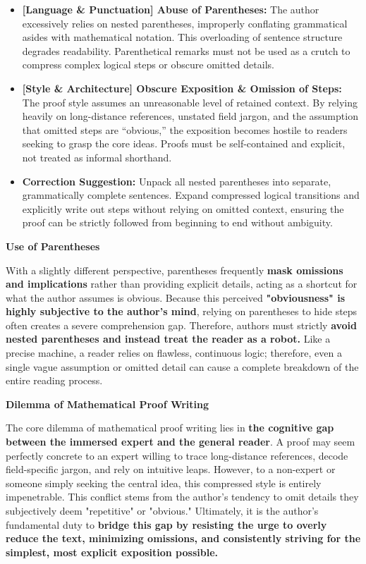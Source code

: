 \documentclass[11pt, a4paper]{article}
\begin{document}
\begin{itemize}
    \item \textcolor{NavyBlue}{\textbf{[Language \& Punctuation] Abuse of Parentheses:}} The author excessively relies on nested parentheses, improperly conflating grammatical asides with mathematical notation. This overloading of sentence structure degrades readability. Parenthetical remarks must not be used as a crutch to compress complex logical steps or obscure omitted details.
    
    \item \textcolor{RustOrange}{\textbf{[Style \& Architecture] Obscure Exposition \& Omission of Steps:}} The proof style assumes an unreasonable level of retained context. By relying heavily on long-distance references, unstated field jargon, and the assumption that omitted steps are ``obvious,'' the exposition becomes hostile to readers seeking to grasp the core ideas. Proofs must be self-contained and explicit, not treated as informal shorthand.
    
    \item \textbf{Correction Suggestion:} Unpack all nested parentheses into separate, grammatically complete sentences. Expand compressed logical transitions and explicitly write out steps without relying on omitted context, ensuring the proof can be strictly followed from beginning to end without ambiguity.
\end{itemize}

\textbf{Use of Parentheses}

With a slightly different perspective, parentheses frequently \textbf{mask omissions and implications} rather than providing explicit details, acting as a shortcut for what the author assumes is obvious. Because this perceived \textbf{"obviousness" is highly subjective to the author's mind}, relying on parentheses to hide steps often creates a severe comprehension gap. Therefore, authors must strictly \textbf{avoid nested parentheses and instead treat the reader as a robot.} Like a precise machine, a reader relies on flawless, continuous logic; therefore, even a single vague assumption or omitted detail can cause a complete breakdown of the entire reading process.

\textbf{Dilemma of Mathematical Proof Writing}

The core dilemma of mathematical proof writing lies in \textbf{the cognitive gap between the immersed expert and the general reader}. A proof may seem perfectly concrete to an expert willing to trace long-distance references, decode field-specific jargon, and rely on intuitive leaps. However, to a non-expert or someone simply seeking the central idea, this compressed style is entirely impenetrable. This conflict stems from the author's tendency to omit details they subjectively deem "repetitive" or "obvious." Ultimately, it is the author's fundamental duty to \textbf{bridge this gap by resisting the urge to overly reduce the text, minimizing omissions, and consistently striving for the simplest, most explicit exposition possible.}
\end{document}
